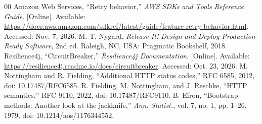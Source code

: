 \documentclass[conference,a4paper]{IEEEtran}
\begin{document}
\begin{thebibliography}{00}
 Amazon Web Services, ``Retry behavior,'' \emph{AWS SDKs and Tools Reference Guide}. [Online]. Available: \url{https://docs.aws.amazon.com/sdkref/latest/guide/feature-retry-behavior.html}. Accessed: Nov. 7, 2026.
 M. T. Nygard, \emph{Release It! Design and Deploy Production-Ready Software}, 2nd ed. Raleigh, NC, USA: Pragmatic Bookshelf, 2018.
 Resilience4j, ``CircuitBreaker,'' \emph{Resilience4j Documentation}. [Online]. Available: \url{https://resilience4j.readme.io/docs/circuitbreaker}. Accessed: Oct. 23, 2026.
 M. Nottingham and R. Fielding, ``Additional HTTP status codes,'' RFC 6585, 2012, doi: 10.17487/RFC6585.
 R. Fielding, M. Nottingham, and J. Reschke, ``HTTP semantics,'' RFC 9110, 2022, doi: 10.17487/RFC9110.
 B. Efron, ``Bootstrap methods: Another look at the jackknife,'' \emph{Ann. Statist.}, vol. 7, no. 1, pp. 1--26, 1979, doi: 10.1214/aos/1176344552.
\end{thebibliography}
\end{document}
